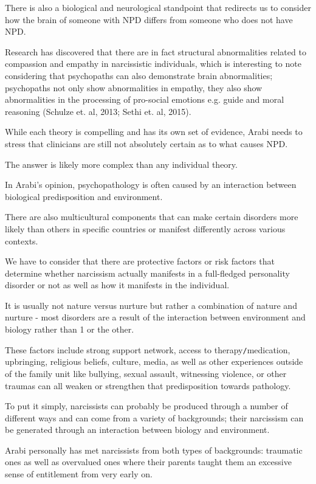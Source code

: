 \documentclass[oneside]{book}
\numberwithin{equation}{section}
\begin{document}
There is also a biological and neurological standpoint that redirects us to consider how the brain of someone with NPD differs from someone who does not have NPD.

%
Research has discovered that there are in fact structural abnormalities related to compassion and empathy in narcissistic individuals, which is interesting to note considering that psychopaths can also demonstrate brain abnormalities; psychopaths not only show abnormalities in empathy, they also show abnormalities in the processing of pro-social emotions e.g. guide and moral reasoning (Schulze et. al, 2013; Sethi et. al, 2015).

%
While each theory is compelling and has its own set of evidence, Arabi needs to stress that clinicians are still not absolutely certain as to what causes NPD.

The answer is likely more complex than any individual theory.

In Arabi's opinion, psychopathology is often caused by an interaction between biological predisposition and environment.

There are also multicultural components that can make certain disorders more likely than others in specific countries or manifest differently across various contexts.

%
We have to consider that there are protective factors or risk factors that determine whether narcissism actually manifests in a full-fledged personality disorder or not as well as how it manifests in the individual.

It is usually not nature versus nurture but rather a combination of nature and nurture - most disorders are a result of the interaction between environment and biology rather than 1 or the other.

These factors include strong support network, access to therapy\texttt{/}medication, upbringing, religious beliefs, culture, media, as well as other experiences outside of the family unit like bullying, sexual assault, witnessing violence, or other traumas can all weaken or strengthen that predisposition towards pathology.

%
To put it simply, narcissists can probably be produced through a number of different ways and can come from a variety of backgrounds; their narcissism can be generated through an interaction between biology and environment.

Arabi personally has met narcissists from both types of backgrounds: traumatic ones as well as overvalued ones where their parents taught them an excessive sense of entitlement from very early on.
\end{document}
